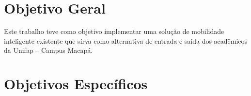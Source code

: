 \begin{comment}
que os problemas de mobilidade existentes
atualmente em Macapá atingem diretamente a comunidade acadêmica da Universidade Federal do Amapá, este trabalho buscará entender o perfil e as principais dificuldades da comunidade acadêmica, e, a partir de um estudo de soluções existentes no contexto de CI para propor uma solução que seja viável e admissível para a comunidade acadêmica da Unifap

%
\end{comment}

\section {Objetivo Geral}

Este trabalho teve como objetivo implementar uma solução de mobilidade inteligente existente que sirva como alternativa de entrada e saída dos acadêmicos da Unifap -- Campus Macapá.

\begin{comment}
Este trabalho tem como objetivo principal o estudo sobre Mobilidade Inteligente
considerando o contexto de mobilidade relacionado à Universidade Federal do Amapá
e realizar o debate sobre a viabilidade de utilização pela comunidade acadêmica em geral (docentes, discentes e técnicos) de soluções tecnológicas existentes, visando oferecer alternativa(s) de transporte que dê acesso e diminua problemas diários enfrentados para chegar e/ou sair da universidade.
\end{comment}

\section{Objetivos Específicos}


